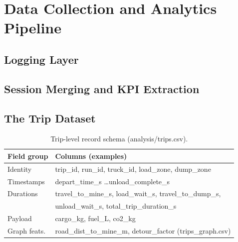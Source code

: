 \section{Data Collection and Analytics Pipeline}

\subsection{Logging Layer}

\subsection{Session Merging and KPI Extraction}

\subsection{The Trip Dataset}
\begin{table}[t]
  \centering
  \caption{Trip-level record schema (analysis/trips.csv).}
  \label{tab:trips-schema}
  \begin{tabular}{ll}
    \toprule
    Field group & Columns (examples) \\
    \midrule
    Identity     & trip\_id, run\_id, truck\_id, load\_zone, dump\_zone \\
    Timestamps   & depart\_time\_s \ldots unload\_complete\_s \\
    Durations    & travel\_to\_mine\_s, load\_wait\_s, travel\_to\_dump\_s, \\
                 & unload\_wait\_s, total\_trip\_duration\_s \\
    Payload      & cargo\_kg, fuel\_L, co2\_kg \\
    Graph feats. & road\_dist\_to\_mine\_m, detour\_factor (trips\_graph.csv) \\
    \bottomrule
  \end{tabular}
\end{table}

